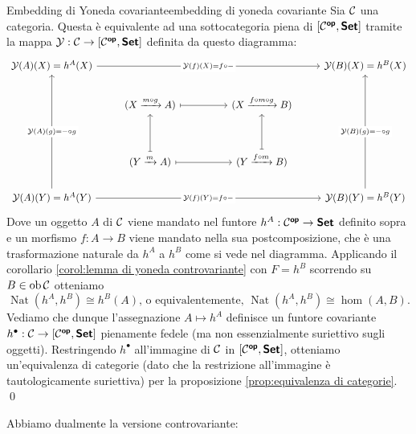 \documentclass{article}
\renewcommand\C{\mc{C}}
\newcommand\nat{\operatorname{Nat}}
\begin{document}
\begin{theorem}{Embedding di Yoneda covariante}{embedding di yoneda covariante}
    Sia $\C$ una categoria. Questa è equivalente ad una sottocategoria piena di $[\C^\op, \setcat]$ tramite la mappa $\mc{Y} : \C \to [\C^\op, \setcat]$ definita da questo diagramma:
    \[\begin{tikzcd}
    	{\mc{Y}(A)(X) = h^A(X)} &&&& {\mc{Y}(B)(X) = h^B(X)} \\
    	& {(X \xrightarrow{m\circ g} A)} && {(X \xrightarrow{f\circ m\circ g} B)} \\
    	\\
    	& {(Y \xrightarrow{m} A)} && {(Y \xrightarrow{f\circ m} B)} \\
    	{\mc{Y}(A)(Y) = h^A(Y)} &&&& {\mc{Y}(B)(Y) = h^B(Y)}
    	\arrow["{\mc{Y}(f)(X) = f\circ -}"{description}, from=1-1, to=1-5]
    	\arrow[maps to, from=2-2, to=2-4]
    	\arrow[maps to, from=4-2, to=2-2]
    	\arrow[maps to, from=4-2, to=4-4]
    	\arrow[maps to, from=4-4, to=2-4]
    	\arrow["{\mc{Y}(A)(g) = -\circ g}"{description}, from=5-1, to=1-1]
    	\arrow["{\mc{Y}(f)(Y) = f\circ -}"{description}, from=5-1, to=5-5]
	    \arrow["{\mc{Y}(B)(g) = -\circ g}"{description}, from=5-5, to=1-5]
    \end{tikzcd}\]
    Dove un oggetto $A$ di $\C$ viene mandato nel funtore $h^A : \C^\op \to \setcat$ definito sopra e un morfismo $f:A\to B$ viene mandato nella sua postcomposizione, che è una trasformazione naturale da $h^A$ a $h^B$ come si vede nel diagramma.
    \proof
    Applicando il corollario \ref{corol:lemma di yoneda controvariante} con $F = h^B$ scorrendo su $B \in \ob\C$ otteniamo
    \[\nat(h^A, h^B) \cong h^B(A) \text{, o equivalentemente, } \nat(h^A, h^B)\cong \hom(A,B).\]
    Vediamo che dunque l'assegnazione $A\mapsto h^A$ definisce un funtore covariante $h^\bullet : \C\to [\C^\op,\setcat]$ pienamente fedele (ma non essenzialmente suriettivo sugli oggetti). Restringendo $h^\bullet$ all'immagine di $\C$ in $[\C^\op,\setcat]$, otteniamo un'equivalenza di categorie (dato che la restrizione all'immagine è tautologicamente suriettiva) per la proposizione \ref{prop:equivalenza di categorie}.
    \qed
\end{theorem}

Abbiamo dualmente la versione controvariante:
\end{document}
